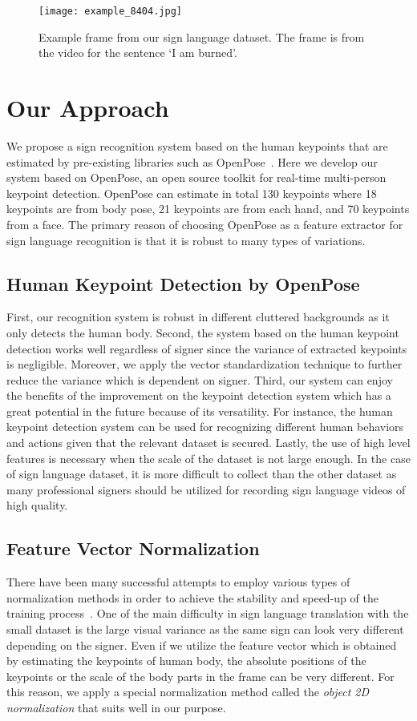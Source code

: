 \documentclass[10pt,twocolumn,letterpaper]{article}
\begin{document}
\begin{figure}[htb]\label{fig:example_frame}
\centering
\texttt{[image: example\_8404.jpg]}
\caption{Example frame from our sign language dataset. The frame is from the video for the sentence `I am burned'.}
\end{figure}


\section{Our Approach}
We propose a sign recognition system based on the human keypoints that are estimated by pre-existing libraries such as OpenPose~\cite{CaoSWS17,SimonJMS17,WeiRKS16}. Here we develop our system based on OpenPose, an open source toolkit for real-time multi-person keypoint detection. OpenPose can estimate in total 130 keypoints where 18 keypoints are from body pose, 21 keypoints are from each hand, and 70 keypoints from a face. The primary reason of choosing OpenPose as a feature extractor for sign language recognition is that it is robust to many types of variations.

\subsection{Human Keypoint Detection by OpenPose}

First, our recognition system is robust in different cluttered backgrounds as it only detects the human body. Second, the system based on the human keypoint detection works well regardless of signer since the variance of extracted keypoints is negligible. Moreover, we apply the vector standardization technique to further reduce the variance which is dependent on signer. Third, our system can enjoy the benefits of the improvement on the keypoint detection system which has a great potential in the future because of its versatility. For instance, the human keypoint detection system can be used for recognizing different human behaviors and actions given that the relevant dataset is secured. Lastly, the use of high level features is necessary when the scale of the dataset is not large enough. In the case of sign language dataset, it is more difficult to collect than the other dataset as many professional signers should be utilized for recording sign language videos of high quality.

\subsection{Feature Vector Normalization}
There have been many successful attempts to employ various types of normalization methods in order to achieve the stability and speed-up of the training process~\cite{BaKH16,IoffeS15,UlyanovVL16}. One of the main difficulty in sign language translation with the small dataset is the large visual variance as the same sign can look very different depending on the signer. Even if we utilize the feature vector which is obtained by estimating the keypoints of human body, the absolute positions of the keypoints or the scale of the body parts in the frame can be very different.
For this reason, we apply a special normalization method called the {\em object 2D normalization} that suits well in our purpose. 
\end{document}

